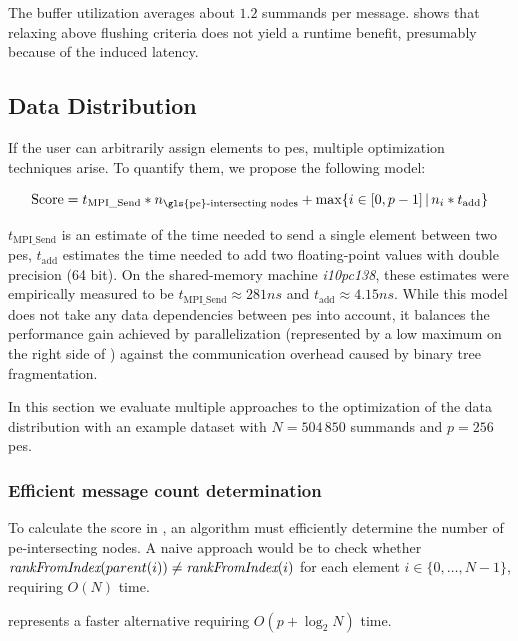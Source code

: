The buffer utilization averages about $1.2$ summands per message.
 shows that relaxing above flushing criteria does not yield a runtime benefit, presumably because of the induced latency.

\subsection{Data Distribution}
\label{sec:DataDistribution}

If the user can arbitrarily assign elements to \glspl{pe}, multiple optimization techniques arise. To quantify them, we propose the following model:

\begin{equation}
\label{eq:distributionScore}
\textrm{Score} = t_{\textrm{MPI\_Send}} * n_{\textrm{\gls{pe}-intersecting nodes}} + \max \{ i \in [0, p - 1]\, |\, n_i * t_{\textrm{add}} \}
\end{equation}

$t_{\textrm{MPI\_Send}}$ is an estimate of the time needed to send a single element between two \glspl{pe}, $t_\textrm{add}$ estimates the time needed to add two floating-point values with double precision (64 bit).
On the shared-memory machine \textit{i10pc138}, these estimates were empirically measured to be $t_{\textrm{MPI\_Send}} \approx 281ns$ and $t_\textrm{add} \approx 4.15ns$.
While this model does not take any data dependencies between \glspl{pe} into account, it balances the performance gain achieved by parallelization (represented by a low maximum on the right side of ) against the communication overhead caused by binary tree fragmentation. 

In this section we evaluate multiple approaches to the optimization of the data distribution with an example dataset with $N = 504\,850$ summands and $p = 256$ \glspl{pe}.

\subsubsection{Efficient message count determination}
To calculate the score in , an algorithm must efficiently determine the number of \gls{pe}-intersecting nodes.
A naive approach would be to check whether $\textit{rankFromIndex}(parent(i)) \neq \textit{rankFromIndex}(i)$ for each element $i \in \{0, \ldots, N-1\}$, requiring $O(N)$ time.

 represents a faster alternative requiring $O(p + \log_2 N)$ time.

